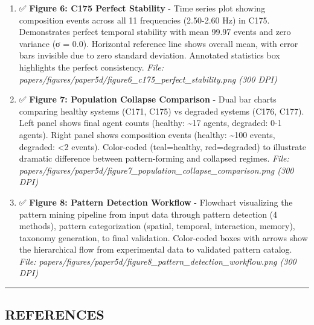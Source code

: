 \documentclass[
]{article}
\begin{document}
\begin{enumerate}
  (88.2\%), followed by memory patterns (11.8\%). Spatial and
  interaction patterns absent from current dataset. \emph{File:
  papers/figures/paper5d/figure5\_pattern\_statistics.png (300 DPI)}
\item
  ✅ \textbf{Figure 6: C175 Perfect Stability} - Time series plot
  showing composition events across all 11 frequencies (2.50-2.60 Hz) in
  C175. Demonstrates perfect temporal stability with mean 99.97 events
  and zero variance (σ = 0.0). Horizontal reference line shows overall
  mean, with error bars invisible due to zero standard deviation.
  Annotated statistics box highlights the perfect consistency.
  \emph{File:
  papers/figures/paper5d/figure6\_c175\_perfect\_stability.png (300
  DPI)}
\item
  ✅ \textbf{Figure 7: Population Collapse Comparison} - Dual bar charts
  comparing healthy systems (C171, C175) vs degraded systems (C176,
  C177). Left panel shows final agent counts (healthy: \textasciitilde17
  agents, degraded: 0-1 agents). Right panel shows composition events
  (healthy: \textasciitilde100 events, degraded: \textless2 events).
  Color-coded (teal=healthy, red=degraded) to illustrate dramatic
  difference between pattern-forming and collapsed regimes. \emph{File:
  papers/figures/paper5d/figure7\_population\_collapse\_comparison.png
  (300 DPI)}
\item
  ✅ \textbf{Figure 8: Pattern Detection Workflow} - Flowchart
  visualizing the pattern mining pipeline from input data through
  pattern detection (4 methods), pattern categorization (spatial,
  temporal, interaction, memory), taxonomy generation, to final
  validation. Color-coded boxes with arrows show the hierarchical flow
  from experimental data to validated pattern catalog. \emph{File:
  papers/figures/paper5d/figure8\_pattern\_detection\_workflow.png (300
  DPI)}
\end{enumerate}

\begin{center}\rule{0.5\linewidth}{0.5pt}\end{center}

\subsection{REFERENCES}\label{references}
\end{document}
